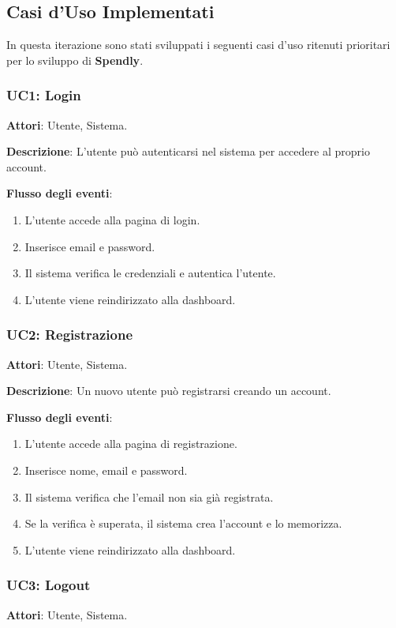 \subsection{Casi d'Uso Implementati }

In questa iterazione sono stati sviluppati i seguenti casi d’uso ritenuti prioritari per lo sviluppo di \textbf{Spendly}.

\subsubsection{UC1: Login}
\textbf{Attori}: Utente, Sistema.

\textbf{Descrizione}: L'utente può autenticarsi nel sistema per accedere al proprio account.

\textbf{Flusso degli eventi}:
\begin{enumerate}
    \item L'utente accede alla pagina di login.
    \item Inserisce email e password.
    \item Il sistema verifica le credenziali e autentica l'utente.
    \item L'utente viene reindirizzato alla dashboard.
\end{enumerate}

\subsubsection{UC2: Registrazione}
\textbf{Attori}: Utente, Sistema.

\textbf{Descrizione}: Un nuovo utente può registrarsi creando un account.

\textbf{Flusso degli eventi}:
\begin{enumerate}
    \item L'utente accede alla pagina di registrazione.
    \item Inserisce nome, email e password.
    \item Il sistema verifica che l’email non sia già registrata.
    \item Se la verifica è superata, il sistema crea l’account e lo memorizza.
    \item L'utente viene reindirizzato alla dashboard.
\end{enumerate}

\subsubsection{UC3: Logout}
\textbf{Attori}: Utente, Sistema.

